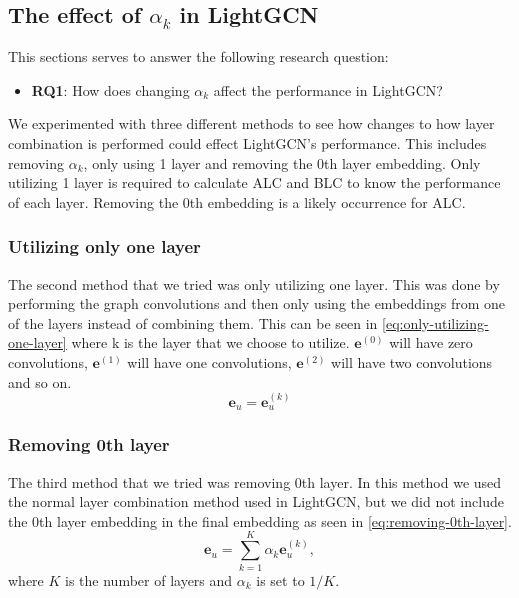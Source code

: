 \subsection{The effect of $\alpha_k$ in LightGCN}\label{sec:method:alpha-k-effect}
This sections serves to answer the following research question:
\begin{itemize}
	\item \textbf{RQ1}: How does changing $\alpha_k$ affect the performance in LightGCN?
\end{itemize}
We experimented with three different methods to see how changes to how layer combination is performed could effect LightGCN's performance.
This includes removing $\alpha_k$, only using 1 layer and removing the 0th layer embedding.
Only utilizing 1 layer is required to calculate ALC and BLC to know the performance of each layer.
Removing the 0th embedding is a likely occurrence for ALC.

\subsubsection{Utilizing only one layer}\label{subsubsec:only-1-layer}
The second method that we tried was only utilizing one layer.
This was done by performing the graph convolutions and then only using the embeddings from one of the layers instead of combining them.
This can be seen in \autoref{eq:only-utilizing-one-layer} where k is the layer that we choose to utilize. 
$\mathbf{e}^{(0)}$ will have zero convolutions, $\mathbf{e}^{(1)}$ will have one convolutions, $\mathbf{e}^{(2)}$ will have two convolutions and so on.
\begin{equation}
	\mathbf{e}_u = \mathbf{e}_u^{(k)}
	\label{eq:only-utilizing-one-layer}
\end{equation}

\subsubsection{Removing 0th layer}\label{subsubsec:remove-0-layer}
The third method that we tried was removing 0th layer.
In this method we used the normal layer combination method used in LightGCN, but we did not include the 0th layer embedding in the final embedding as seen in \autoref{eq:removing-0th-layer}.
\begin{equation}
	\mathbf{e}_u = \sum_{k=1}^{K} \alpha_k \mathbf{e}_u^{(k)},
	\label{eq:removing-0th-layer}
\end{equation}
where $K$ is the number of layers and $\alpha_k$ is set to $1/K$.
